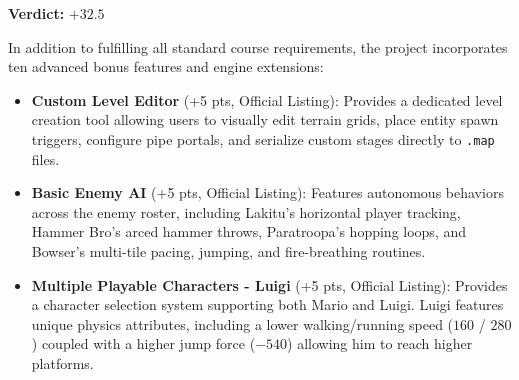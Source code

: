\documentclass[12pt, a4paper]{article}
\begin{document}
\textbf{Verdict:} $+32.5$

In addition to fulfilling all standard course requirements, the project incorporates ten advanced bonus features and engine extensions:

\begin{itemize}
\item \textbf{Custom Level Editor} (+5 pts, Official Listing): Provides a dedicated level creation tool allowing users to visually edit terrain grids, place entity spawn triggers, configure pipe portals, and serialize custom stages directly to \texttt{.map} files.
\item \textbf{Basic Enemy AI} (+5 pts, Official Listing): Features autonomous behaviors across the enemy roster, including Lakitu's horizontal player tracking, Hammer Bro's arced hammer throws, Paratroopa's hopping loops, and Bowser's multi-tile pacing, jumping, and fire-breathing routines.
\item \textbf{Multiple Playable Characters  -  Luigi} (+5 pts, Official Listing): Provides a character selection system supporting both Mario and Luigi. Luigi features unique physics attributes, including a lower walking/running speed ($160$ / $280$) coupled with a higher jump force ($-540$) allowing him to reach higher platforms.

\newpage


\end{itemize}
\end{document}
